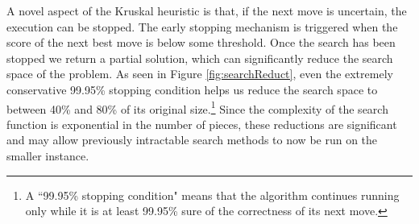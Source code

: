 \documentclass{llncs}
\begin{document}
A novel aspect of the Kruskal heuristic is that, if the next move is uncertain, the execution can be stopped. The early stopping mechanism is triggered when the score of the next best move is below some threshold. Once the search has been stopped we return a partial solution, which can significantly reduce the search space of the problem. As seen in Figure \ref{fig:searchReduct}, even the extremely conservative 99.95\% stopping condition helps us reduce the search space to between 40\% and 80\% of its original size.\footnote{A ``99.95\% stopping condition" means that the algorithm continues running only while it is at least 99.95\% sure of the correctness of its next move.} Since the complexity of the search function is exponential in the number of pieces, these reductions are significant and may allow previously intractable search methods to now be run on the smaller instance.
\end{document}
